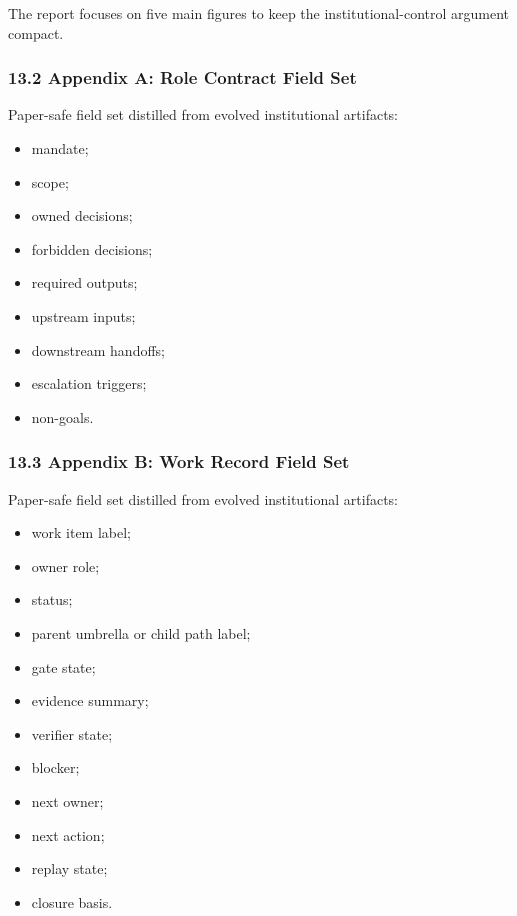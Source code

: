 \documentclass[
]{article}
\providecommand{\tightlist}{%
  \setlength{\itemsep}{0pt}\setlength{\parskip}{0pt}}
\begin{document}
The report focuses on five main figures to keep the institutional-control argument compact.

\subsubsection{13.2 Appendix A: Role Contract Field Set}\label{appendix-a-role-contract-field-set}

Paper-safe field set distilled from evolved institutional artifacts:

\begin{itemize}
\tightlist
\item
  mandate;
\item
  scope;
\item
  owned decisions;
\item
  forbidden decisions;
\item
  required outputs;
\item
  upstream inputs;
\item
  downstream handoffs;
\item
  escalation triggers;
\item
  non-goals.
\end{itemize}

\subsubsection{13.3 Appendix B: Work Record Field Set}\label{appendix-b-work-record-field-set}

Paper-safe field set distilled from evolved institutional artifacts:

\begin{itemize}
\tightlist
\item
  work item label;
\item
  owner role;
\item
  status;
\item
  parent umbrella or child path label;
\item
  gate state;
\item
  evidence summary;
\item
  verifier state;
\item
  blocker;
\item
  next owner;
\item
  next action;
\item
  replay state;
\item
  closure basis.
\end{itemize}
\end{document}
